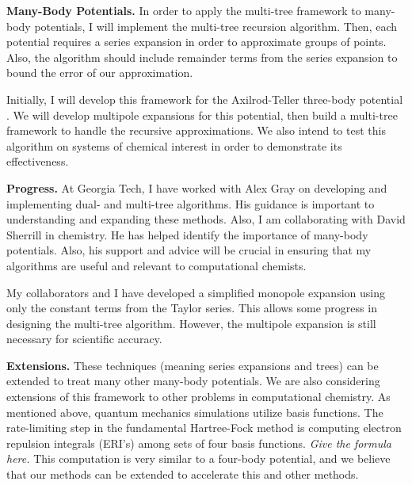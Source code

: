 \documentclass[twoside,leqno, 12pt]{article}
\begin{document}
\textbf{Many-Body Potentials.}  In order to apply the multi-tree framework to many-body potentials, I will implement the multi-tree recursion algorithm.  Then, each potential requires a series expansion in order to approximate groups of points.  Also, the algorithm should include remainder terms from the series expansion to bound the error of our approximation.

Initially, I will develop this framework for the Axilrod-Teller three-body potential \cite{axilrod_teller}.  We will develop multipole expansions for this potential, then build a multi-tree framework to handle the recursive approximations.  We also intend to test this algorithm on systems of chemical interest in order to demonstrate its effectiveness.  

\textbf{Progress.}
At Georgia Tech, I have worked with Alex Gray on developing and implementing dual- and multi-tree algorithms.  His guidance is important to understanding and expanding these methods.  Also, I am collaborating with David Sherrill in chemistry.  He has helped identify the importance of many-body potentials.  Also, his support and advice will be crucial in ensuring that my algorithms are useful and relevant to computational chemists.  

My collaborators and I have developed a simplified monopole expansion using only the constant terms from the Taylor series.  This allows some progress in designing the multi-tree algorithm.  However, the multipole expansion is still necessary for scientific accuracy.  

\textbf{Extensions.}  These techniques (meaning series expansions and trees) can be extended to treat many other many-body potentials.  We are also considering extensions of this framework to other problems in computational chemistry.  As mentioned above, quantum mechanics simulations utilize basis functions.  The rate-limiting step in the fundamental Hartree-Fock method is computing electron repulsion integrals (ERI's) among sets of four basis functions.  \textit{Give the formula here.}  This computation is very similar to a four-body potential, and we believe that our methods can be extended to accelerate this and other methods.







\end{document}

